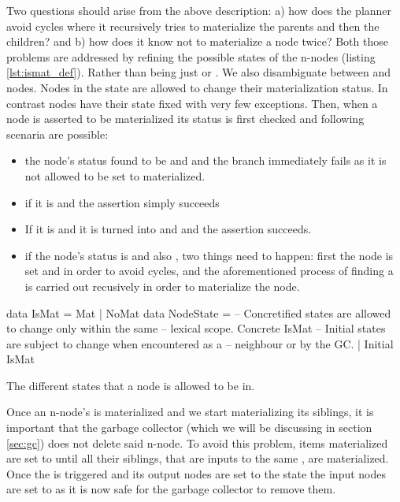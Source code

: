 Two questions should arise from the above description: a) how does the
planner avoid cycles where it recursively tries to materialize the
parents and then the children? and b) how does it know not to
materialize a node twice? Both those problems are addressed by
refining the possible states of the n-nodes (listing
\ref{lst:ismat_def}). Rather than being just  or
. We also disambiguate between  and
 nodes. Nodes in the  state are allowed
to change their materialization status. In contrast 
nodes have their state fixed with very few exceptions. Then, when a
node is asserted to be materialized its status is first checked and
following scenaria are possible:

\begin{itemize}
\item the node's status found to be  and 
  and the branch immediately fails as it is not allowed to be set to
  materialized.
\item if it is  and  the assertion simply
  succeeds
\item If it is  and  it is turned into
   and  and the assertion succeeds.
\item if the node's status is  and also ,
  two things need to happen: first the node is set  and
   in order to avoid cycles, and the aforementioned
  process of finding a  is carried out recusively in
  order to materialize the node.
\end{itemize}

\begin{code}
\begin{haskellcode}
data IsMat = Mat | NoMat
data NodeState =
  -- Concretified states are allowed to change only within the same
  -- lexical scope.
  Concrete IsMat
  -- Initial states are subject to change when encountered as a
  -- neighbour or by the GC.
  | Initial IsMat
\end{haskellcode}
  \caption{\label{lst:ismat_def}The different states that a node is
    allowed to be in.}
\end{code}


Once an n-node's is materialized and we start materializing its
siblings, it is important that the garbage collector (which we will be
discussing in section \ref{sec:gc}) does not delete said n-node.  To
avoid this problem, items materialized are set to 
until all their siblings, that are inputs to the same ,
are materialized. Once the  is triggered and its output
nodes are set to the  state the input nodes are set
to  as it is now safe for the garbage collector to
remove them.

